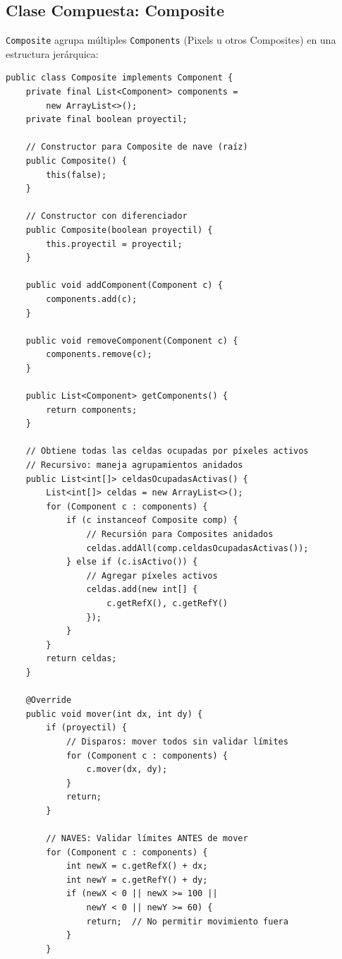 \documentclass[12pt]{article}
\begin{document}
\subsection{Clase Compuesta: Composite}

\texttt{Composite} agrupa múltiples \texttt{Components} (Pixels u otros Composites) en una estructura jerárquica:

\begin{lstlisting}
public class Composite implements Component {
    private final List<Component> components = 
        new ArrayList<>();
    private final boolean proyectil;
    
    // Constructor para Composite de nave (raíz)
    public Composite() {
        this(false);
    }
    
    // Constructor con diferenciador
    public Composite(boolean proyectil) {
        this.proyectil = proyectil;
    }
    
    public void addComponent(Component c) {
        components.add(c);
    }
    
    public void removeComponent(Component c) {
        components.remove(c);
    }
    
    public List<Component> getComponents() {
        return components;
    }
    
    // Obtiene todas las celdas ocupadas por píxeles activos
    // Recursivo: maneja agrupamientos anidados
    public List<int[]> celdasOcupadasActivas() {
        List<int[]> celdas = new ArrayList<>();
        for (Component c : components) {
            if (c instanceof Composite comp) {
                // Recursión para Composites anidados
                celdas.addAll(comp.celdasOcupadasActivas());
            } else if (c.isActivo()) {
                // Agregar píxeles activos
                celdas.add(new int[] { 
                    c.getRefX(), c.getRefY() 
                });
            }
        }
        return celdas;
    }
    
    @Override
    public void mover(int dx, int dy) {
        if (proyectil) {
            // Disparos: mover todos sin validar límites
            for (Component c : components) {
                c.mover(dx, dy);
            }
            return;
        }
        
        // NAVES: Validar límites ANTES de mover
        for (Component c : components) {
            int newX = c.getRefX() + dx;
            int newY = c.getRefY() + dy;
            if (newX < 0 || newX >= 100 || 
                newY < 0 || newY >= 60) {
                return;  // No permitir movimiento fuera
            }
        }
        

\end{lstlisting}
\end{document}
